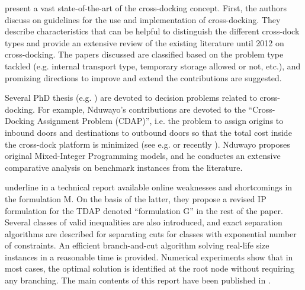\documentclass[preprint,12pt,authoryear]{elsarticle}
\begin{document}
    
    \citet{VANBELLE2012} present a vast state-of-the-art of the cross-docking concept. 
    First, the authors discuss on guidelines for the use and implementation of cross-docking.
    They describe characteristics that can be helpful to distinguish the different cross-dock types and provide an extensive  review of the existing literature until 2012 on cross-docking.
    The papers discussed are classified based on the problem type tackled (e.g. internal transport type, temporary storage allowed or not, etc.), and promizing directions to improve and extend the contributions are suggested.


    Several  PhD thesis (e.g. \citet{Zhu2007PhD,Ladier2014PhD,Zhang2016PhD,Nassief2017PhD,Nduwayo2020PhD}) are devoted to decision problems related to cross-docking.
    For example, Nduwayo's contributions \citep{Nduwayo2020,Nduwayo2020PhD} are devoted to the ``Cross-Docking Assignment Problem (CDAP)'', i.e. the problem to assign origins to inbound doors and destinations to outbound doors so that the total cost inside the cross-dock platform is minimized (see e.g. \citet{TSUI1992,Zhu2009} or recently \citet{Belen2024}). Nduwayo proposes original Mixed-Integer Programming models, and he conductes an extensive comparative analysis on benchmark instances from the literature.



     \citet{Gelareh2015} underline in a technical report available online  weaknesses and shortcomings in the formulation M. On the basis of the latter, they propose a revised IP formulation for the TDAP denoted ``formulation G'' in the rest of the paper.
    Several classes of valid inequalities are also introduced, and exact separation algorithms are described for separating cuts for classes with exponential number of constraints. An efficient branch-and-cut algorithm solving real-life size instances in a reasonable time is provided.
    Numerical experiments show that in most cases, the optimal solution is identified at the root node without requiring any branching.
    The main contents of this report have been published in \cite{GELAREH2016}.
        
\end{document}
